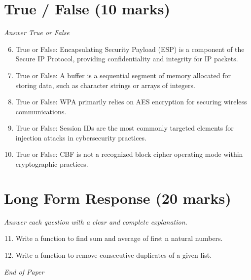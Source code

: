 \documentclass[12pt]{article}
\begin{document}
\section*{True / False (10 marks)}
\textit{Answer True or False}
\begin{enumerate}[label=\arabic*.]
\setcounter{enumi}{5}
\item True or False: Encapsulating Security Payload (ESP) is a component of the Secure IP Protocol, providing confidentiality and integrity for IP packets.
\item True or False: A buffer is a sequential segment of memory allocated for storing data, such as character strings or arrays of integers.
\item True or False: WPA primarily relies on AES encryption for securing wireless communications.
\item True or False: Session IDs are the most commonly targeted elements for injection attacks in cybersecurity practices.
\item True or False: CBF is not a recognized block cipher operating mode within cryptographic practices.
\end{enumerate}

\section*{Long Form Response (20 marks)}
\textit{Answer each question with a clear and complete explanation.}
\begin{enumerate}[label=\arabic*.]
\setcounter{enumi}{10}
\item Write a function to find sum and average of first n natural numbers.
\item Write a function to remove consecutive duplicates of a given list.
\end{enumerate}

\vfill
\noindent\textit{End of Paper}
\end{document}

